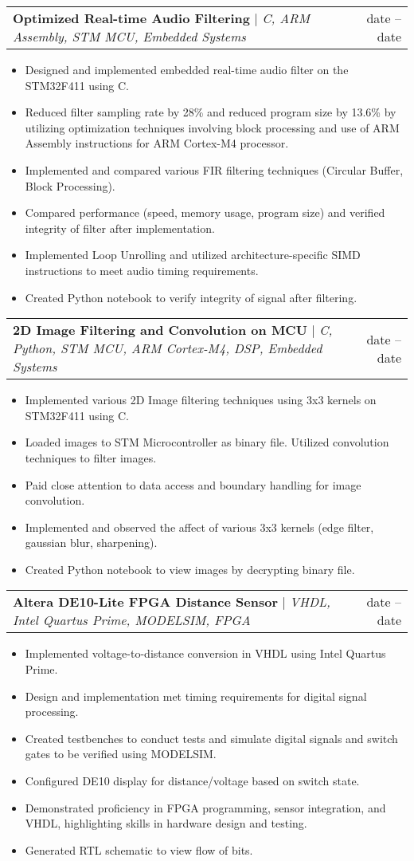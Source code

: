\documentclass[A4,10pt]{article}
\makeatletter
\newcommand{\resumeItem}[1]{
  \item\small{
    {#1 \vspace{-2pt}}
  }
}
\newcommand{\resumeProjectHeading}[2]{
    \item
    \begin{tabular*}{0.97\textwidth}{l@{\extracolsep{\fill}}r}
      \small#1 & #2 \\
    \end{tabular*}\vspace{-7pt}
}
\newcommand{\resumeItemListStart}{\begin{itemize}}
\newcommand{\resumeItemListEnd}{\end{itemize}\vspace{-5pt}}
\makeatother
\begin{document}
        \resumeProjectHeading
        {\textbf{Optimized Real-time Audio Filtering} $|$ \emph{C, ARM Assembly, STM MCU, Embedded Systems}}{date -- date}
        \resumeItemListStart
          \resumeItem{Designed and implemented embedded real-time audio filter on the STM32F411 using C.}
          \resumeItem{Reduced filter sampling rate by 28\% and reduced program size by 13.6\% by utilizing optimization techniques involving block processing and use of ARM Assembly instructions for ARM Cortex-M4 processor.}
          \resumeItem{Implemented and compared various FIR filtering techniques (Circular Buffer, Block Processing).}
          \resumeItem{Compared performance (speed, memory usage, program size) and verified integrity of filter after implementation.}
          \resumeItem{Implemented Loop Unrolling and utilized architecture-specific SIMD instructions to meet audio timing requirements.}
          \resumeItem{Created Python notebook to verify integrity of signal after filtering.}
        \resumeItemListEnd
        
        \resumeProjectHeading
        {\textbf{2D Image Filtering and Convolution on MCU} $|$ \emph{C, Python, STM MCU, ARM Cortex-M4, DSP, Embedded Systems}}{date -- date}
        \resumeItemListStart
          \resumeItem{Implemented various 2D Image filtering techniques using 3x3 kernels on STM32F411 using C.}
          \resumeItem{Loaded images to STM Microcontroller as binary file. Utilized convolution techniques to filter images.}
          \resumeItem{Paid close attention to data access and boundary handling for image convolution.}
          \resumeItem{Implemented and observed the affect of various 3x3 kernels (edge filter, gaussian blur, sharpening).}
          \resumeItem{Created Python notebook to view images by decrypting binary file.}
        \resumeItemListEnd

        \resumeProjectHeading
        {\textbf{Altera DE10-Lite FPGA Distance Sensor} $|$ \emph{VHDL, Intel Quartus Prime, MODELSIM, FPGA}}{date -- date}
        \resumeItemListStart
          \resumeItem{Implemented voltage-to-distance conversion in VHDL using Intel Quartus Prime.}
          \resumeItem{Design and implementation met timing requirements for digital signal processing.}
          \resumeItem{Created testbenches to conduct tests and simulate digital signals and switch gates to be verified using MODELSIM.}
          \resumeItem{Configured DE10 display for distance/voltage based on switch state.}
          \resumeItem{Demonstrated proficiency in FPGA programming, sensor integration, and VHDL, highlighting skills in hardware design and testing.}
          \resumeItem{Generated RTL schematic to view flow of bits.}
        \resumeItemListEnd
  
\end{document}
